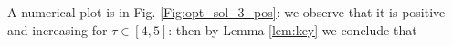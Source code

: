\documentclass[reqno]{amsart}
\theoremstyle{definition} \newtheorem{definition}{Definition}[section]
\theoremstyle{definition} \newtheorem{remark}[definition]{Remark}
\theoremstyle{plain} \newtheorem{lemma}[definition]{Lemma}
\theoremstyle{plain} \newtheorem{proposition}[definition]{Proposition}
\theoremstyle{plain} \newtheorem{theorem}[definition]{Theorem}
\theoremstyle{plain} \newtheorem{corollary}[definition]{Corollary}
\theoremstyle{definition} \newtheorem{example}[definition]{Example}
\theoremstyle{plain} \newtheorem{claim}[clai]{Claim}
\theoremstyle{definition} \newtheorem{assumption}[definition]{Assumption}
\theoremstyle{definition} \newtheorem{observation}[definition]{Observation}
\newcommand{\1}{\mathbbm 1}
\numberwithin{equation}{section} %
\theoremstyle{plain} \newtheorem*{theorem*}{Theorem}
\theoremstyle{plain} \newtheorem{mthm}[maintheorem]{Main Theorem}
\theoremstyle{plain} \newtheorem*{mthm*}{Main Theorem}
\theoremstyle{plain} \newtheorem*{conjecture*}{Conjecture}
\theoremstyle{plain} \newtheorem{conjecture}[definition]{Conjecture}
\theoremstyle{plain} \newtheorem*{problem*}{Problem}
\begin{document}
A numerical plot is in Fig. \ref{Fig:opt_sol_3_pos}: we observe that it is positive and increasing for $\tau \in [4,5]$: then by Lemma \ref{lem:key} we conclude that 


\end{document}
